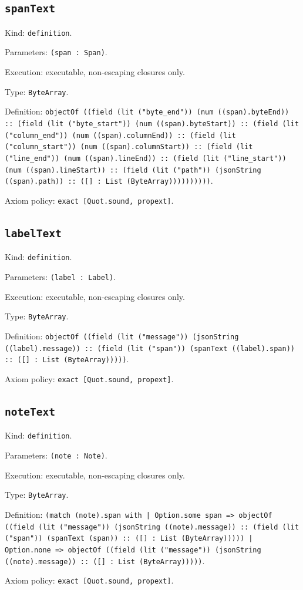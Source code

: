 \documentclass[11pt]{article}
\begin{document}
\subsection*{\texttt{spanText}}
\noindent Kind: \texttt{definition}.\par
\noindent Parameters: \texttt{(span : Span)}.\par
\noindent Execution: executable, non-escaping closures only.\par
\noindent Type: \texttt{ByteArray}.\par
\noindent Definition: \texttt{objectOf ((field (lit ("byte\_end")) (num ((span).byteEnd)) :: (field (lit ("byte\_start")) (num ((span).byteStart)) :: (field (lit ("column\_end")) (num ((span).columnEnd)) :: (field (lit ("column\_start")) (num ((span).columnStart)) :: (field (lit ("line\_end")) (num ((span).lineEnd)) :: (field (lit ("line\_start")) (num ((span).lineStart)) :: (field (lit ("path")) (jsonString ((span).path)) :: ([] : List (ByteArray))))))))))}.\par
\noindent Axiom policy: \texttt{exact [Quot.sound, propext]}.\par
\subsection*{\texttt{labelText}}
\noindent Kind: \texttt{definition}.\par
\noindent Parameters: \texttt{(label : Label)}.\par
\noindent Execution: executable, non-escaping closures only.\par
\noindent Type: \texttt{ByteArray}.\par
\noindent Definition: \texttt{objectOf ((field (lit ("message")) (jsonString ((label).message)) :: (field (lit ("span")) (spanText ((label).span)) :: ([] : List (ByteArray)))))}.\par
\noindent Axiom policy: \texttt{exact [Quot.sound, propext]}.\par
\subsection*{\texttt{noteText}}
\noindent Kind: \texttt{definition}.\par
\noindent Parameters: \texttt{(note : Note)}.\par
\noindent Execution: executable, non-escaping closures only.\par
\noindent Type: \texttt{ByteArray}.\par
\noindent Definition: \texttt{(match (note).span with | Option.some span => objectOf ((field (lit ("message")) (jsonString ((note).message)) :: (field (lit ("span")) (spanText (span)) :: ([] : List (ByteArray))))) | Option.none => objectOf ((field (lit ("message")) (jsonString ((note).message)) :: ([] : List (ByteArray)))))}.\par
\noindent Axiom policy: \texttt{exact [Quot.sound, propext]}.\par
\end{document}
